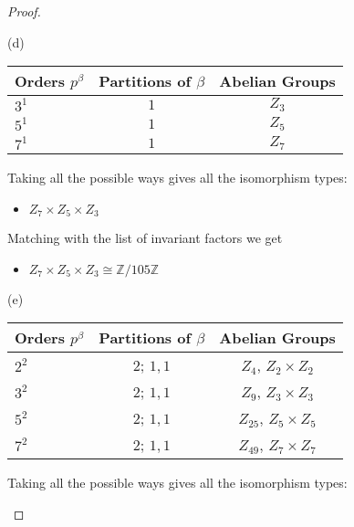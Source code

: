 \documentclass[10pt]{article}
\newcommand{\Z}{\mathbb{Z}}
\begin{document}
\begin{itemize}
\begin{proof}
\begin{item}
\end{item}

\begin{item} (d)
\begin{center}
  \begin{tabular}{ l c c  }
    Orders $p^{\beta}$ & Partitions of $\beta$ & Abelian Groups\\ \hline
    $3^1$ & $1$ & $Z_{3}$ \\ \hline
	  $5^1$ & $1$ & $Z_{5}$\\ \hline
	  $7^1$ & $1$ & $Z_{7}$\\ \hline
	\hline
  \end{tabular}
\end{center} 

Taking all the possible ways gives all the isomorphism types:

\begin{itemize}
	\item $Z_7 \times Z_{5} \times Z_{3}$
\end{itemize}

Matching with the list of invariant factors we get
\begin{itemize}
\item $Z_7 \times Z_{5} \times Z_{3}\cong \Z / 105\Z$
\end{itemize}
\end{item}

\begin{item} (e)
\begin{center}
  \begin{tabular}{ l c  c  }
    Orders $p^{\beta}$ & Partitions of $\beta$ & Abelian Groups\\ \hline
    $2^{2}$ & $2$; $1,1$ & $Z_{4}$, $Z_{2}\times Z_{2}$ \\ \hline
    $3^{2}$ & $2$; $1,1$ & $Z_{9}$, $Z_{3}\times Z_{3}$ \\ \hline
    $5^{2}$ & $2$; $1,1$ & $Z_{25}$, $Z_{5}\times Z_{5}$ \\ \hline
    $7^{2}$ & $2$; $1,1$ & $Z_{49}$, $Z_{7}\times Z_{7}$ \\ \hline
	\hline
  \end{tabular}
\end{center} 

Taking all the possible ways gives all the isomorphism types:


\end{item}
\end{proof}
\end{itemize}
\end{document}
